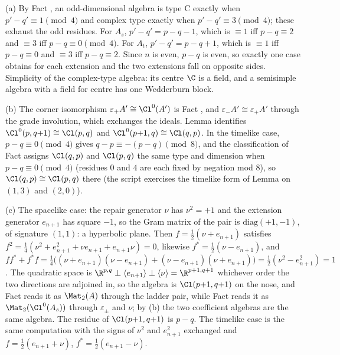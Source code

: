 (a) By Fact , an odd-dimensional algebra is type C exactly when $p' - q' \equiv 1 \pmod 4$ and complex type exactly when $p' - q' \equiv 3 \pmod 4$; these exhaust the odd residues. For $A_s$, $p' - q' = p - q - 1$, which is $\equiv 1$ iff $p - q \equiv 2$ and $\equiv 3$ iff $p - q \equiv 0 \pmod 4$. For $A_t$, $p' - q' = p - q + 1$, which is $\equiv 1$ iff $p - q \equiv 0$ and $\equiv 3$ iff $p - q \equiv 2$. Since $n$ is even, $p - q$ is even, so exactly one case obtains for each extension and the two extensions fall on opposite sides. Simplicity of the complex-type algebra: its centre $\C$ is a field, and a semisimple algebra with a field for centre has one Wedderburn block.

(b) The corner isomorphism $\varepsilon_+ A' \cong \Cl^0(A')$ is Fact , and $\varepsilon_- A' \cong \varepsilon_+ A'$ through the grade involution, which exchanges the ideals. Lemma  identifies $\Cl^0(p,q{+}1) \cong \Cl(p,q)$ and $\Cl^0(p{+}1,q) \cong \Cl(q,p)$. In the timelike case, $p - q \equiv 0 \pmod 4$ gives $q - p \equiv -(p-q) \pmod 8$, and the classification of Fact  assigns $\Cl(q,p)$ and $\Cl(p,q)$ the same type and dimension when $p - q \equiv 0 \pmod 4$ (residues $0$ and $4$ are each fixed by negation mod 8), so $\Cl(q,p) \cong \Cl(p,q)$ there (the script exercises the timelike form of Lemma  on $(1,3)$ and $(2,0)$).

(c) The spacelike case: the repair generator $\nu$ has $\nu^2 = +1$ and the extension generator $e_{n+1}$ has square $-1$, so the Gram matrix of the pair is $\mathrm{diag}(+1,-1)$, of signature $(1,1)$: a hyperbolic plane. Then $f = \tfrac12(\nu + e_{n+1})$ satisfies $f^2 = \tfrac14(\nu^2 + e_{n+1}^2 + \nu e_{n+1} + e_{n+1}\nu) = 0$, likewise $f^* = \tfrac12(\nu - e_{n+1})$, and $ff^* + f^*f = \tfrac14\bigl((\nu + e_{n+1})(\nu - e_{n+1}) + (\nu - e_{n+1})(\nu + e_{n+1})\bigr) = \tfrac12(\nu^2 - e_{n+1}^2) = 1$. The quadratic space is $\R^{p,q} \perp \langle e_{n+1}\rangle \perp \langle \nu \rangle = \R^{p+1,q+1}$ whichever order the two directions are adjoined in, so the algebra is $\Cl(p{+}1,q{+}1)$ on the nose, and Fact  reads it as $\Mat_2(A)$ through the ladder pair, while Fact  reads it as $\Mat_2(\Cl^0(A_s))$ through $\varepsilon_\pm$ and $\nu$; by (b) the two coefficient algebras are the same algebra. The residue of $\Cl(p{+}1,q{+}1)$ is $p - q$. The timelike case is the same computation with the signs of $\nu^2$ and $e_{n+1}^2$ exchanged and $f = \tfrac12(e_{n+1} + \nu)$, $f^* = \tfrac12(e_{n+1} - \nu)$.

